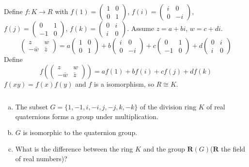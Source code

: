 \begin{answer}
    Define $f:K\to R$ with $f(1)=\begin{pmatrix}
        1&0\\0&1
    \end{pmatrix}$, $f(i)=\begin{pmatrix}
        i&0\\0&-i
    \end{pmatrix}$, $f(j)=\begin{pmatrix}
        0&1\\-1&0
    \end{pmatrix}$, $f(k)=\begin{pmatrix}
        0&i\\i&0
    \end{pmatrix}$. Assume $z=a+bi$, $w=c+di$.
    \[\begin{pmatrix}
        z& w\\ -\bar{w}&\bar{z}
    \end{pmatrix}=a\begin{pmatrix}
        1&0\\0&1
    \end{pmatrix}+b\begin{pmatrix}
        i&0\\0&-i
    \end{pmatrix}+c\begin{pmatrix}
        0&1\\-1&0
    \end{pmatrix}+d\begin{pmatrix}
        0&i\\i&0
    \end{pmatrix}\]Define\[f(\begin{pmatrix}
        z& w\\ -\bar{w}&\bar{z}
    \end{pmatrix})=af(1)+bf(i)+cf(j)+df(k)\]$f(xy)=f(x)f(y)$ and $f$ is a isomorphism, so $R\cong K$.
\end{answer}

$$ $$

\begin{ex}
    \begin{enumerate}[(a)]
        \item The subset $G=\{1,-1, i, -i, j, -j, k, -k\}$ of the division ring $K$ of real quaternions forms a group under multiplication.
        \item $G$ is isomorphic to the quaternion group.
        \item What is the difference between the ring $K$ and the group $\mathbf{R}(G)$($\mathbf{R}$ the field of real numbers)?
    \end{enumerate}
\end{ex}

